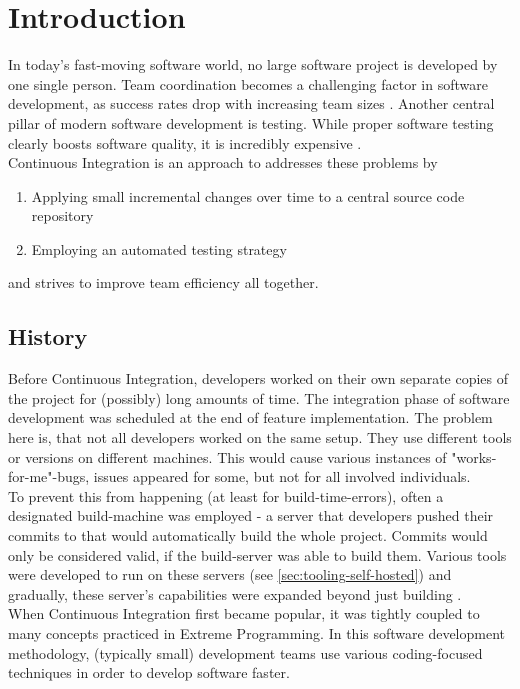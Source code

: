 \section{Introduction}\label{sec:introduction}

In today's fast-moving software world, no large software project is developed by
one single person. Team coordination becomes a challenging factor in software
development, as success rates drop with increasing team sizes
\cite{ambler:2010}. Another central pillar of modern software development is
testing. While proper software testing clearly boosts software quality, it is
incredibly expensive \cite{dustin:1999}.\\

Continuous Integration is an approach to addresses these problems by
\begin{enumerate}[label=(\alph*)]
    \item Applying small incremental changes over time to a central source code
       repository
    \item Employing an automated testing strategy
\end{enumerate}

and strives to improve team efficiency all together.

\subsection{History}\label{sec:history}

Before Continuous Integration, developers worked on their own separate copies of
the project for (possibly) long amounts of time. The integration phase of
software development was scheduled at the end of feature implementation. The
problem here is, that not all developers worked on the same setup. They use
different tools or versions on different machines. This would cause various
instances of "works-for-me"-bugs, issues appeared for some, but not for all
involved individuals.\\

To prevent this from happening (at least for build-time-errors), often a
designated build-machine was employed - a server that developers pushed their
commits to that would automatically build the whole project. Commits would only
be considered valid, if the build-server was able to build them. Various tools
were developed to run on these servers (see \ref{sec:tooling-self-hosted}) and gradually,
these server's capabilities were expanded beyond just building
\cite{zilberfeld:2013}.\\

When Continuous Integration first became popular, it was tightly coupled to many
concepts practiced in Extreme Programming. In this software development
methodology, (typically small) development teams use various coding-focused
techniques in order to develop software faster.


